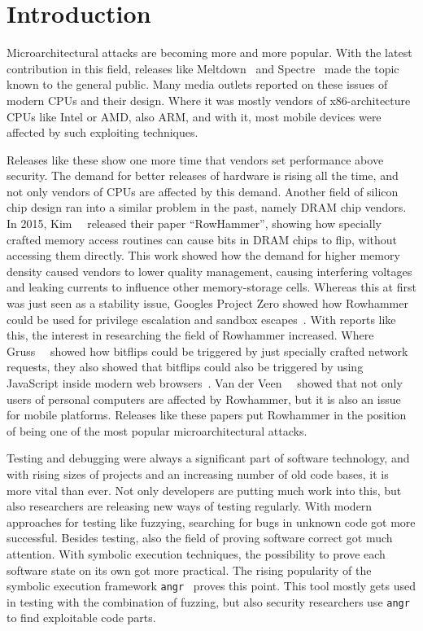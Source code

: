 \chapter{Introduction}\label{sec:intro}

Microarchitectural attacks are becoming more and more popular. With the latest
contribution in this field, releases like Meltdown~\cite{meltdown} and
Spectre~\cite{spectre} made the topic known to the general public. Many media
outlets reported on these issues of modern CPUs and their design. Where it was
mostly vendors of x86-architecture CPUs like Intel or AMD, also ARM, and with
it, most mobile devices were affected by such exploiting techniques.

Releases like these show one more time that vendors set performance above
security. The demand for better releases of hardware is rising all the time, and
not only vendors of CPUs are affected by this demand. Another field of silicon
chip design ran into a similar problem in the past, namely DRAM chip vendors. In
2015, Kim~\etal~\cite{rowhammergeneral} released their paper ``RowHammer'',
showing how specially crafted memory access routines can cause bits in DRAM
chips to flip, without accessing them directly. This work showed how the demand
for higher memory density caused vendors to lower quality management, causing
interfering voltages and leaking currents to influence other memory-storage
cells. Whereas this at first was just seen as a stability issue,
Google\textquotesingle s Project Zero showed how Rowhammer could be used for
privilege escalation and sandbox escapes~\cite{projectzerorow}. With reports
like this, the interest in researching the field of Rowhammer increased. Where
Gruss~\etal~\cite{nethammer} showed how bitflips could be triggered by just
specially crafted network requests, they also showed that bitflips could also be
triggered by using JavaScript inside modern web browsers~\cite{rowhammerjs}. Van
der Veen~\etal~\cite{drammer} showed that not only users of personal computers
are affected by Rowhammer, but it is also an issue for mobile platforms.
Releases like these papers put Rowhammer in the position of being one of the
most popular microarchitectural attacks.

Testing and debugging were always a significant part of software technology, and
with rising sizes of projects and an increasing number of old code bases, it is
more vital than ever. Not only developers are putting much work into this, but
also researchers are releasing new ways of testing regularly. With modern
approaches for testing like fuzzying, searching for bugs in unknown code got
more successful. Besides testing, also the field of proving software correct got
much attention. With symbolic execution techniques, the possibility to prove
each software state on its own got more practical. The rising popularity of the
symbolic execution framework \texttt{angr}~\cite{angrpaper} proves this point.
This tool mostly gets used in testing with the combination of fuzzing, but also
security researchers use \texttt{angr} to find exploitable code parts.

